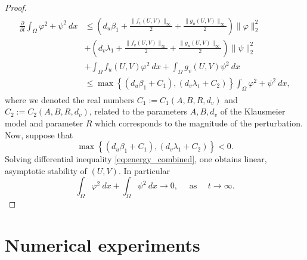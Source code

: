 \documentclass[12pt, a4paper]{article}
\theoremstyle{break}
\theoremstyle{break}
\theoremstyle{break}
\theoremstyle{break}
\theoremstyle{break}
\theoremstyle{break}
\theoremstyle{break}
\begin{document}
\begin{proof}
    \begin{align}
        \label{eq:energy_combined}
        \begin{split}
            \frac{\partial}{\partial t} \int_\Omega \varphi^2 + \psi^2\:dx
            &\leq
            \left(d_u \beta_1 + \frac{\|f_v(U,V)\|_\infty}{2} + \frac{\|g_u(U,V)\|_\infty}{2}\right) \|\varphi\|_2^2 \\
            &+
            \left(d_v \lambda_1 + \frac{\|f_v(U,V)\|_\infty}{2} + \frac{\|g_u(U,V)\|_\infty}{2} \right) \|\psi\|_2^2 \\
            &+ 
            \int_\Omega f_u(U,V) \varphi^2\:dx
            +
            \int_\Omega g_v(U,V) \psi^2 \:dx \\
            &\leq
            \max\left\{\left(d_u \beta_1 + C_1
            \right), \left(d_v \lambda_1 + C_2\right)\right\}\int_\Omega \varphi^2 + \psi^2\:dx,
        \end{split}
    \end{align}
    where we denoted the real numbers $C_1:=C_1(A,B,R,d_v)$ and $C_2:=C_2(A,B, R, d_v)$, related to the parameters $A, B, d_v$ of the Klausmeier model and parameter $R$ which corresponds to the magnitude of the perturbation. Now, suppose that
    \begin{equation}
        \label{eq:linearized_stability_condition}
        \max\left\{\left(d_u \beta_1 + C_1
            \right), \left(d_v \lambda_1 + C_2\right)\right\} < 0.
    \end{equation}
    Solving differential inequality \eqref{eq:energy_combined}, one obtains linear, asymptotic stability of $(U, V)$. In particular
    \begin{equation}
        \int_\Omega \varphi^2\:dx + \int_\Omega \psi^2\:dx \rightarrow 0, \quad \text{ as } \quad t \rightarrow \infty.
    \end{equation}
\end{proof}

\section{Numerical experiments}
\end{document}
